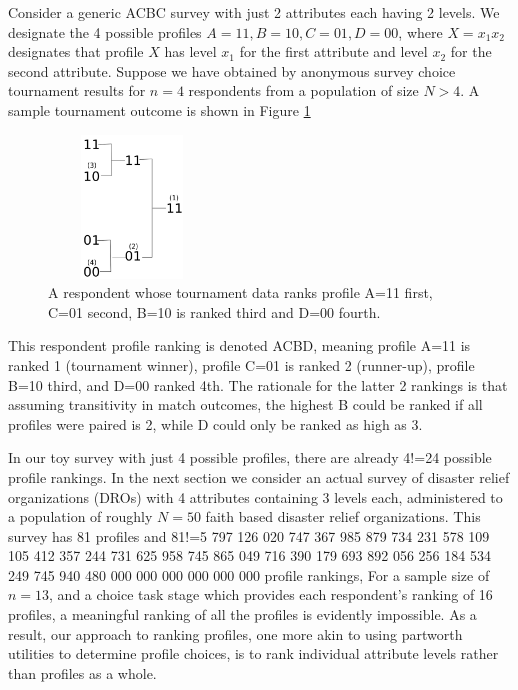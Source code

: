 \documentclass[a4paper, 12pt]{article}
\begin{document}
Consider a generic ACBC survey with just 2 attributes each having 2 levels. We designate the 4 possible profiles $A=11, B=10, C=01, D=00$, where $X=x_1x_2$ designates that profile $X$ has level $x_1$ for the first attribute and level $x_2$ for the second attribute. Suppose we have obtained by anonymous survey choice tournament results  for $n=4$ respondents from a population of size $N>4$.  A sample tournament outcome is shown in Figure \ref{SimpleTourn}
\begin{figure}[!htpb]
\centering
\includegraphics[width=1.75in, height=1.5in]{SimpleTourn.png}
\caption{A respondent whose tournament data ranks profile A=11 first, C=01 second, B=10 is ranked third and D=00 fourth.  }
\label{SimpleTourn}
\end{figure}

{\flushleft This} respondent profile ranking is denoted ACBD, meaning profile A=11 is ranked 1 (tournament winner), profile C=01 is ranked 2 (runner-up), profile B=10 third, and D=00 ranked 4th. The rationale for the latter 2 rankings is that assuming transitivity in match outcomes, the highest B could be ranked if all profiles were paired is 2, while D could only be ranked as high as 3. 

In our toy survey with just 4 possible profiles, there are already 4!=24 possible profile rankings. In the next section we consider an actual survey of disaster relief organizations (DROs) with 4 attributes containing 3 levels each, administered to a population of roughly $N=50$ faith based disaster relief organizations. This survey  has 81 profiles and 81!=5 797 126 020 747 367 985 879 734 231 578 109 105 412 357 244 731 625 958 745 865 049 716 390
 179 693 892 056 256 184 534 249 745 940 480 000 000 000 000 000 000 profile rankings,  For a sample size of $n=13$, and a choice task stage  which provides each respondent's ranking of 16 profiles, a meaningful ranking of  all the profiles is evidently impossible. As a result, our approach to ranking profiles, one more akin to using partworth utilities to determine profile choices, is to rank individual attribute levels rather than profiles as a whole. 
\end{document}
